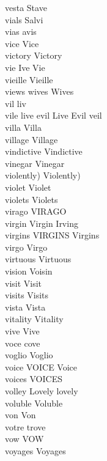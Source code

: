 vesta Stave\\
vials Salvi\\
vias avis\\
vice Vice\\
victory Victory\\
vie Ive Vie\\
vieille Vieille\\
views wives Wives\\
vil liv\\
vile live evil Live Evil veil\\
villa Villa\\
village Village\\
vindictive Vindictive\\
vinegar Vinegar\\
violently) Violently)\\
violet Violet\\
violets Violets\\
virago VIRAGO\\
virgin Virgin Irving\\
virgins VIRGINS Virgins\\
virgo Virgo\\
virtuous Virtuous\\
vision Voisin\\
visit Visit\\
visits Visits\\
vista Vista\\
vitality Vitality\\
vive Vive\\
voce cove\\
voglio Voglio\\
voice VOICE Voice\\
voices VOICES\\
volley Lovely lovely\\
voluble Voluble\\
von Von\\
votre trove\\
vow VOW\\
voyages Voyages\\

